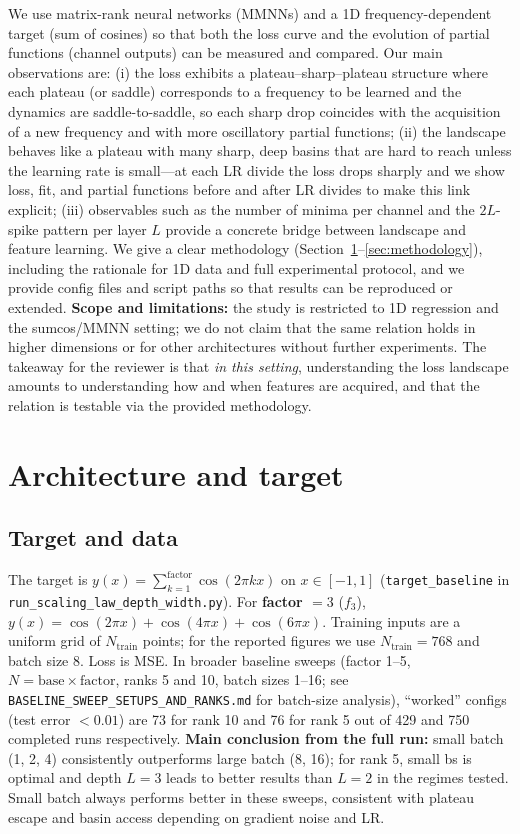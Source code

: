 \documentclass{article}
\begin{document}
We use matrix-rank neural networks (MMNNs) and a 1D frequency-dependent target (sum of cosines) so that both the loss curve and the evolution of partial functions (channel outputs) can be measured and compared. Our main observations are: (i) the loss exhibits a plateau--sharp--plateau structure where each plateau (or saddle) corresponds to a frequency to be learned and the dynamics are saddle-to-saddle, so each sharp drop coincides with the acquisition of a new frequency and with more oscillatory partial functions; (ii) the landscape behaves like a plateau with many sharp, deep basins that are hard to reach unless the learning rate is small---at each LR divide the loss drops sharply and we show loss, fit, and partial functions before and after LR divides to make this link explicit; (iii) observables such as the number of minima per channel and the $2L$-spike pattern per layer $L$ provide a concrete bridge between landscape and feature learning. We give a clear methodology (Section~\ref{sec:architecture}--\ref{sec:methodology}), including the rationale for 1D data and full experimental protocol, and we provide config files and script paths so that results can be reproduced or extended. \textbf{Scope and limitations:} the study is restricted to 1D regression and the sumcos/MMNN setting; we do not claim that the same relation holds in higher dimensions or for other architectures without further experiments. The takeaway for the reviewer is that \emph{in this setting}, understanding the loss landscape amounts to understanding how and when features are acquired, and that the relation is testable via the provided methodology.

\section{Architecture and target}
\label{sec:architecture}

\subsection{Target and data}
The target is $y(x) = \sum_{k=1}^{\mathrm{factor}} \cos(2\pi k x)$ on $x \in [-1,1]$ (\texttt{target\_baseline} in \texttt{run\_scaling\_law\_depth\_width.py}). For \textbf{factor $= 3$} ($f_3$), $y(x) = \cos(2\pi x) + \cos(4\pi x) + \cos(6\pi x)$. Training inputs are a uniform grid of $N_{\mathrm{train}}$ points; for the reported figures we use $N_{\mathrm{train}} = 768$ and batch size $8$. Loss is MSE. In broader baseline sweeps (factor 1--5, $N = \mathrm{base} \times \mathrm{factor}$, ranks 5 and 10, batch sizes 1--16; see \texttt{BASELINE\_SWEEP\_SETUPS\_AND\_RANKS.md} for batch-size analysis), ``worked'' configs (test error $< 0.01$) are 73 for rank 10 and 76 for rank 5 out of 429 and 750 completed runs respectively. \textbf{Main conclusion from the full run:} small batch (1, 2, 4) consistently outperforms large batch (8, 16); for rank 5, small bs is optimal and depth $L=3$ leads to better results than $L=2$ in the regimes tested. Small batch always performs better in these sweeps, consistent with plateau escape and basin access depending on gradient noise and LR.
\end{document}
